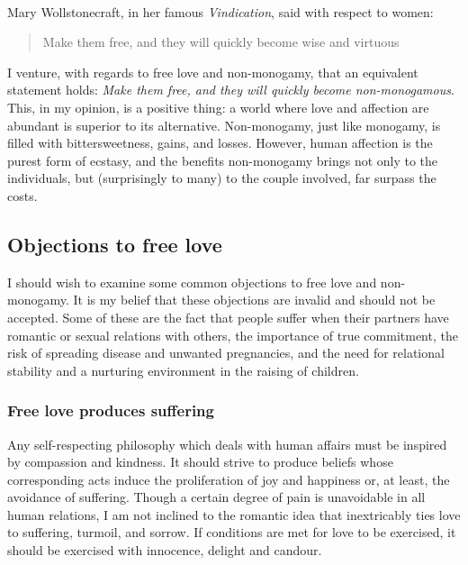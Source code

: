 \documentclass[a4paper, 12pt]{article}
\begin{document}
~

Mary Wollstonecraft, in her famous \textit{Vindication}, said with respect to
women:

\begin{quote}
    Make them free, and they will quickly become wise and virtuous
\end{quote}

I venture, with regards to free love and non-monogamy, that an equivalent
statement holds: \textit{Make them free, and they will quickly become non-monogamous}.
This, in my opinion, is a positive thing: a world where love and affection are
abundant is superior to its alternative. Non-monogamy, just like monogamy, is
filled with bittersweetness, gains, and losses. However, human affection is the
purest form of ecstasy, and the benefits non-monogamy brings not only to the
individuals, but (surprisingly to many) to the couple involved, far surpass the
costs.



\subsection{Objections to free love}


I should wish to examine some common objections to free love and
non-monogamy. It is my belief that these objections are invalid and should not
be accepted. Some of these are the fact that people suffer when their partners
have romantic or sexual relations with others, the importance of true
commitment, the risk of spreading disease and unwanted pregnancies, and the
need for relational stability and a nurturing environment in the raising of children.

\subsubsection{Free love produces suffering}

Any self-respecting philosophy which deals with human affairs must be inspired
by compassion and kindness. It should strive to produce beliefs whose
corresponding acts induce the proliferation of joy and happiness or, at least,
the avoidance of suffering. Though a certain degree of pain is unavoidable 
in all human relations, I am not inclined to the romantic idea that inextricably 
ties love to suffering, turmoil, and sorrow. If conditions are met for love to
be exercised, it should be exercised with innocence, delight and candour.

~ 
\end{document}
